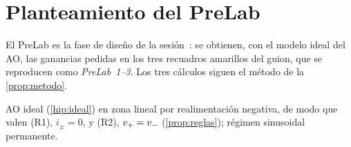 \section{Planteamiento del PreLab}\label{sec:pl-planteamiento}
El PreLab es la fase de diseño de la sesión~\cite{GUION-S1}: se obtienen, con el modelo ideal del AO,
las ganancias pedidas en los tres recuadros amarillos del guion, que se reproducen como
\emph{PreLab~1--3}. Los tres cálculos siguen el método de la \cref{prop:metodo}.

\begin{hipotesis}\label{hip:comunes}
AO ideal (\cref{hip:ideal}) en zona lineal por realimentación negativa, de modo que valen (R1),
$i_\pm=0$, y (R2), $v_{+}=v_{-}$ (\cref{prop:reglas}); régimen sinusoidal permanente.
\end{hipotesis}
